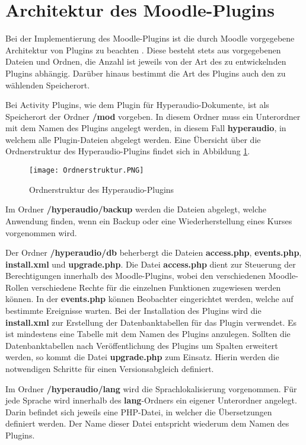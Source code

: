 
\section{Architektur des Moodle-Plugins}
\label{sec:architektur}
Bei der Implementierung des Moodle-Plugins ist die durch Moodle vorgegebene Architektur von Plugins zu beachten \citep{moodle2016activity}. Diese besteht stets aus vorgegebenen Dateien und Ordnen, die Anzahl ist jeweils von der Art des zu entwickelnden Plugins abhängig. Darüber hinaus bestimmt die Art des Plugins auch den zu wählenden Speicherort.

Bei Activity Plugins, wie dem Plugin für Hyperaudio-Dokumente, ist als Speicherort der Ordner \textbf{/mod} vorgeben. In diesem Ordner muss ein Unterordner mit dem Namen des Plugins angelegt werden, in diesem Fall \textbf{hyperaudio}, in welchem alle Plugin-Dateien abgelegt werden. Eine Übersicht über die Ordnerstruktur des Hyperaudio-Plugins findet sich in Abbildung \ref{fig:Ordnerstruktur}.

\begin{figure}[h!]
\texttt{[image: Ordnerstruktur.PNG]}
\caption{\label{fig:Ordnerstruktur}Ordnerstruktur des Hyperaudio-Plugins}
\end{figure}

Im Ordner \textbf{/hyperaudio/backup} werden die Dateien abgelegt, welche Anwendung finden, wenn ein Backup oder eine Wiederherstellung eines Kurses vorgenommen wird.

Der Ordner \textbf{/hyperaudio/db} beherbergt die Dateien \textbf{access.php}, \textbf{events.php}, \textbf{install.xml} und \textbf{upgrade.php}. Die Datei \textbf{access.php} dient zur Steuerung der Berechtigungen innerhalb des Moodle-Plugins, wobei den verschiedenen Moodle-Rollen verschiedene Rechte für die einzelnen Funktionen zugewiesen werden können. In der \textbf{events.php} können Beobachter eingerichtet werden, welche auf bestimmte Ereignisse warten. Bei der Installation des Plugins wird die \textbf{install.xml} zur Erstellung der Datenbanktabellen für das Plugin verwendet. Es ist mindestens eine Tabelle mit dem Namen des Plugins anzulegen. Sollten die Datenbanktabellen nach Veröffentlichung des Plugins um Spalten erweitert werden, so kommt die Datei \textbf{upgrade.php} zum Einsatz. Hierin werden die notwendigen Schritte für einen Versionsabgleich definiert.

Im Ordner \textbf{/hyperaudio/lang} wird die Sprachlokalisierung vorgenommen. Für jede Sprache wird innerhalb des \textbf{lang}-Ordners ein eigener Unterordner angelegt. Darin befindet sich jeweils eine PHP-Datei, in welcher die Übersetzungen definiert werden. Der Name dieser Datei entspricht wiederum dem Namen des Plugins.

